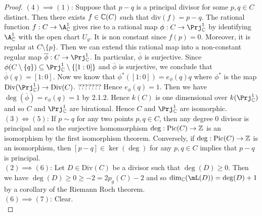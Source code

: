 \documentclass[a4paper]{article}
\begin{document}
\begin{prp}{}{}
\begin{proof}
$(4)\implies(1)$: Suppose that $p-q$ is a principal divisor for some $p,q\in C$ distinct. Then there exists $f\in\mathbb{C}(C)$ such that $\text{div}(f)=p-q$. The rational function $f:C\to\A_\C^1$ gives rise to a rational map $\phi:C\to\Prj_\C^1$ by identifying $\A_\C^1$ with the open chart $U_y$. It is non constant since $f(p)=0$. Moreover, it is regular at $C\setminus\{p\}$. Then we can extend this rational map into a non-constant regular map $\overline{\phi}:C\to\Prj_\C^1$. In particular, $\overline{\phi}$ is surjective. Since $\phi(C\setminus\{q\})\subseteq\Prj_\C^1\setminus\{[1:0]\}$ and $\overline{\phi}$ is surjective, we conclude that $\overline{\phi}(q)=[1:0]$. Now we know that $\phi^\ast([1:0])=e_\phi(q)q$ where $\phi^\ast$ is the map $\text{Div}(\Prj_\C^1)\to\text{Div}(C)$. ??????? Hence $e_\phi(q)=1$. Then we have $\deg(\overline{\phi})=e_\phi(q)=1$ by 2.1.2. Hence $k(C)$ is one dimensional over $k(\Prj_\C^1)$ and so $C$ and $\Prj_\C^1$ are birational. Hence $C$ and $\Prj_\C^1$ are isomorphic. \\

$(3)\iff(5)$: If $p\sim q$ for any two points $p,q\in C$, then any degree $0$ divisor is principal and so the surjective homomorphism $\deg:\text{Pic}(C)\to\mathbb{Z}$ is an isomorphism by the first isomorphism theorem. Conversely, if $\deg:\text{Pic}(C)\to\mathbb{Z}$ is an isomorphism, then $[p-q]\in\ker(\deg)$ for any $p,q\in C$ implies that $p-q$ is principal. \\

$(2)\implies(6)$: Let $D\in\text{Div}(C)$ be a divisor such that $\deg(D)\geq 0$. Then we have $\deg(D)\geq 0\geq -2=2p_g(C)-2$ and so $\dim_\C(\mL(D))=\deg(D)+1$ by a corollary of the Riemann Roch theorem. \\

$(6)\implies(7)$: Clear. \\


\end{proof}
\end{prp}
\end{document}
